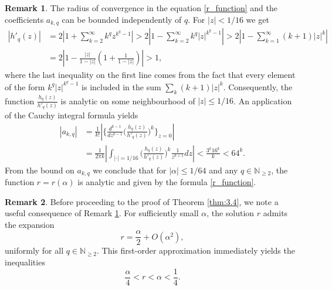 \documentclass[a4paper,twoside, reqno]{amsart}
\numberwithin{equation}{section}
\theoremstyle{definition}%
\newtheorem{Rem}{Remark}
\theoremstyle{definition}
\theoremstyle{definition}%
\theoremstyle{definition}
\newcommand{\N}{\mathbb{N}}
\begin{document}
\begin{Rem} \label{rem_r_function}
    The radius of convergence in the equation \ref{r_function} and the coefficients $a_{k,q}$ can be bounded independently of $q$.
    For $|z| < 1/16$ we get
    \begin{align*}
    |h'_q(z)| &= 2\left|1 + \sum_{k=2}^{\infty} k^{q}z^{k^q - 1}\right| > 2\left|1 - \sum_{k=2}^{\infty} k^{q}|z|^{k^q - 1}\right| > 2\left| 1 - \sum_{k=1}^{\infty}(k+1)|z|^k \right| \\
    &= 2\left| 1 - \frac{|z|}{1-|z|}(1 + \frac{1}{1-|z|})\right| > 1,
    \end{align*}
    where the last inequality on the first line comes from the fact that every element of the form $k^q|z|^{k^q-1}$ is included in the sum  $\sum_{k}(k+1)|z|^k$.
    Consequently, the function $\frac{h_q(z)}{h'_q(z)}$ is analytic on some neighbourhood of $|z|\leq 1/16$.
    An application of the Cauchy integral formula yields
    \begin{align*}
        |a_{k,q}|&= \frac{1}{k!} \left| \Big\{  \frac{d^{k-1}}{dz^{k-1}} \Big(  \frac{h_q(z)}{h'_q(z)}\Big)^k \Big\}_{z=0} \right| \\
        &= \frac{1}{2\pi k} \left| \int_{|\cdot| = 1/16} \Big(  \frac{h_q(z)}{h'_q(z)}\Big)^k \frac{1}{z^{k+1}} dz \right|
        < \frac{3^k 16^k}{k} < 64^k.
    \end{align*}
    From the bound on $a_{k,q}$ we conclude that for $|\alpha|\leq 1/64$ and any $q\in\N_{\geq 2}$, the function $r=r(\alpha)$ is analytic and given by the formula \ref{r_function}.
    
\end{Rem}

\begin{Rem} \label{rem_r_approx}
Before proceeding to the proof of Theorem \ref{thm:3.4}, we note a useful consequence of Remark \ref{rem_r_function}. For sufficiently small $\alpha$, the solution $r$ admits the expansion
\[
    r = \frac{\alpha}{2} + O(\alpha^2),
\]
uniformly for all $q \in \mathbb{N}_{\geq 2}$. This first-order approximation immediately yields the inequalities
\[
    \frac{\alpha}{4} < r < \alpha < \frac{1}{4}.
\]
\end{Rem}
\end{document}
